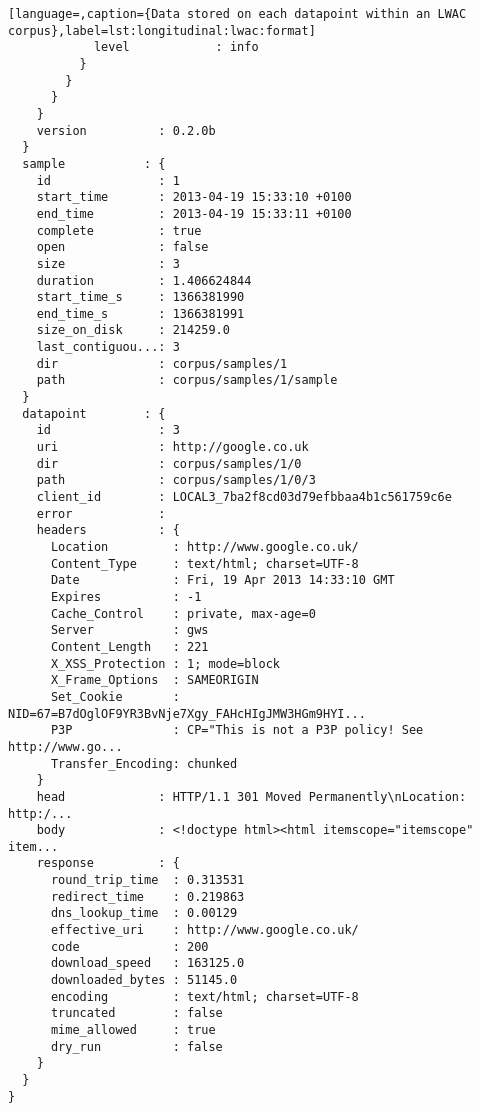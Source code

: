 {\begin{lstlisting}[language=,caption={Data stored on each datapoint within an LWAC corpus},label=lst:longitudinal:lwac:format]
            level            : info
          }
        }
      }
    }
    version          : 0.2.0b
  }
  sample           : {
    id               : 1
    start_time       : 2013-04-19 15:33:10 +0100
    end_time         : 2013-04-19 15:33:11 +0100
    complete         : true
    open             : false
    size             : 3
    duration         : 1.406624844
    start_time_s     : 1366381990
    end_time_s       : 1366381991
    size_on_disk     : 214259.0
    last_contiguou...: 3
    dir              : corpus/samples/1
    path             : corpus/samples/1/sample
  }
  datapoint        : {
    id               : 3
    uri              : http://google.co.uk
    dir              : corpus/samples/1/0
    path             : corpus/samples/1/0/3
    client_id        : LOCAL3_7ba2f8cd03d79efbbaa4b1c561759c6e
    error            :
    headers          : {
      Location         : http://www.google.co.uk/
      Content_Type     : text/html; charset=UTF-8
      Date             : Fri, 19 Apr 2013 14:33:10 GMT
      Expires          : -1
      Cache_Control    : private, max-age=0
      Server           : gws
      Content_Length   : 221
      X_XSS_Protection : 1; mode=block
      X_Frame_Options  : SAMEORIGIN
      Set_Cookie       : NID=67=B7dOglOF9YR3BvNje7Xgy_FAHcHIgJMW3HGm9HYI...
      P3P              : CP="This is not a P3P policy! See http://www.go...
      Transfer_Encoding: chunked
    }
    head             : HTTP/1.1 301 Moved Permanently\nLocation: http:/...
    body             : <!doctype html><html itemscope="itemscope" item...
    response         : {
      round_trip_time  : 0.313531
      redirect_time    : 0.219863
      dns_lookup_time  : 0.00129
      effective_uri    : http://www.google.co.uk/
      code             : 200
      download_speed   : 163125.0
      downloaded_bytes : 51145.0
      encoding         : text/html; charset=UTF-8
      truncated        : false
      mime_allowed     : true
      dry_run          : false
    }
  }
}
\end{lstlisting}

}

